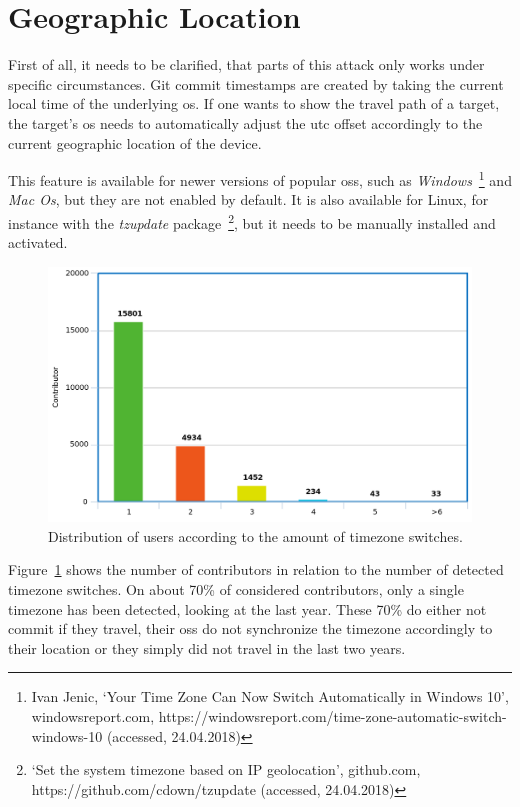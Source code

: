 \section{Geographic Location}

First of all, it needs to be clarified, that parts of this attack only works under specific circumstances.
Git commit timestamps are created by taking the current local time of the underlying \ac{os}.
If one wants to show the travel path of a target, the target's \ac{os} needs to automatically adjust the \ac{utc} offset accordingly to the current geographic location of the device.

This feature is available for newer versions of popular \acp{os}, such as \emph{Windows}~\footnote{Ivan Jenic, `Your Time Zone Can Now Switch Automatically in Windows 10', windowsreport.com, https://windowsreport.com/time-zone-automatic-switch-windows-10 (accessed, 24.04.2018)}
and \emph{Mac Os}, but they are not enabled by default.
It is also available for Linux, for instance with the \emph{tzupdate} package~\footnote{`Set the system timezone based on IP geolocation', github.com, https://github.com/cdown/tzupdate (accessed, 24.04.2018)}, but it needs to be manually installed and activated.

\begin{figure}[H]
    \includegraphics[scale=0.40]{./graphs/analysis/timezone-user-distribution}
    \centering
    \caption{Distribution of users according to the amount of timezone switches.}\label{fig:timezone-distribution}
\end{figure}

Figure~\ref{fig:timezone-distribution} shows the number of contributors in relation to the number of detected timezone switches.
On about 70\% of considered contributors, only a single timezone has been detected, looking at the last year.
These 70\% do either not commit if they travel, their \acp{os} do not synchronize the timezone accordingly to their location or they simply did not travel in the last two years.

